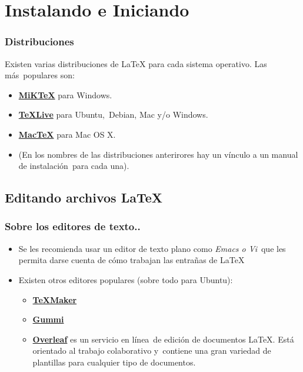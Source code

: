 \documentclass{beamer} %
\begin{document}
\section{Instalando e Iniciando}

\begin{frame}
  \frametitle{Distribuciones}
  Existen varias distribuciones de \LaTeX{} para cada sistema operativo. Las más\
  populares son:
  \begin{itemize}
  \item \href{http://miktex.org/howto/install-miktex}{\textbf{MiK\TeX}} para Windows.
  \item \href{http://milq.github.io/install-latex-ubuntu-debian/}{\textbf{\TeX Live}} para Ubuntu,\
    Debian, Mac y/o Windows.
  \item \href{https://tug.org/mactex/theinstaller.html}{\textbf{Mac\TeX}} para Mac OS X.
  \item (En los nombres de las distribuciones anterirores hay un vínculo a un manual de instalación\
    para cada una).
  \end{itemize}
\end{frame}

\subsection{Editando archivos \LaTeX}

\begin{frame}
  \frametitle{Sobre los editores de texto..}
    \begin{itemize}
    \item  Se les recomienda usar un editor de texto plano como \emph{Emacs o Vi}\
      que les permita darse cuenta de cómo trabajan las entrañas de \LaTeX
    \item Existen otros editores populares (sobre todo para Ubuntu):
      \begin{itemize}
      \item \href{http://www.xm1math.net/texmaker/}{\textbf{\TeX Maker}}
      \item \href{https://github.com/alexandervdm/gummi}{\textbf{Gummi}}
      \item \href{https://www.overleaf.com}{\textbf{Overleaf}} es un servicio en línea\
        de edición de documentos \LaTeX. Está orientado al trabajo colaborativo y\
        contiene una gran variedad de plantillas para cualquier tipo de documentos.
      \end{itemize}
    \end{itemize}
\end{frame}
\end{document}
